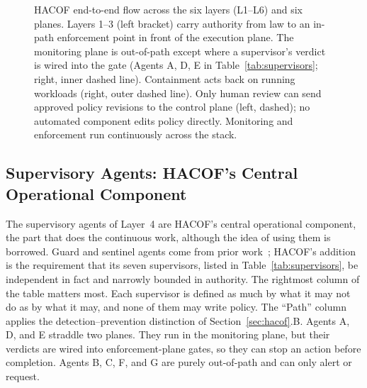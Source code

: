 \documentclass{ieeeaccess}
\newcommand{\hacof}{HACOF}
\begin{document}
\begin{figure}[H]
{%
}
\caption{\hacof{} end-to-end flow across the six layers (L1--L6) and six planes. Layers 1--3 (left bracket) carry authority from law to an in-path enforcement point in front of the execution plane. The monitoring plane is out-of-path except where a supervisor's verdict is wired into the gate (Agents A, D, E in Table~\ref{tab:supervisors}; right, inner dashed line). Containment acts back on running workloads (right, outer dashed line). Only human review can send approved policy revisions to the control plane (left, dashed); no automated component edits policy directly. Monitoring and enforcement run continuously across the stack.}
\label{fig:hacof}
\end{figure}

\subsection{Supervisory Agents: \hacof's Central Operational Component}
\label{sec:hacof-supervisors}

The supervisory agents of Layer~4 are \hacof's central operational component, the part that does the continuous work, although the idea of using them is borrowed. Guard and sentinel agents come from prior work~\cite{greenblatt2024aicontrol,shavit2023agentic,xiang2025guardagent,gosmar2025sentinel};
\hacof's addition is the requirement that its seven supervisors, listed in Table~\ref{tab:supervisors}, be independent in fact and narrowly bounded in authority. The rightmost column of the table matters most. Each supervisor is defined as much by what it may not do as by what it may, and none of them may write policy. The ``Path'' column applies the detection--prevention distinction of Section~\ref{sec:hacof}.B. Agents A, D, and E straddle two planes. They run in the monitoring plane, but their verdicts are wired into enforcement-plane gates, so they can stop an action before completion. Agents B, C, F, and G are purely out-of-path and can only alert or request.
\end{document}
